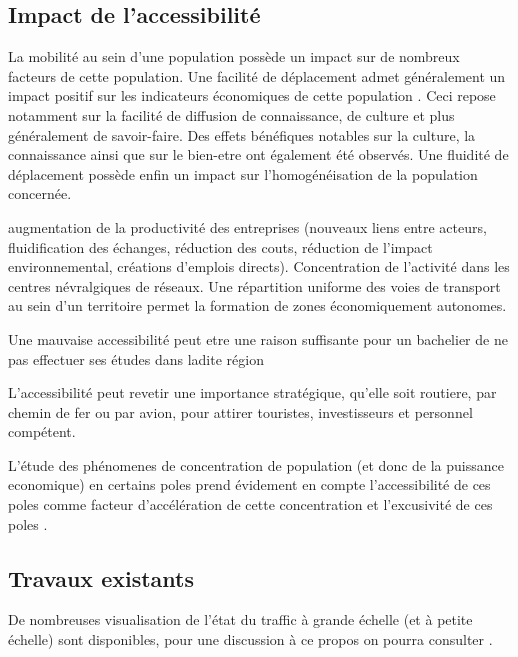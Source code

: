 \documentclass{vgtc}                          %
\begin{document}
\vspace{0.3cm}
\subsection{Impact de l'accessibilité}

\vspace{0.3cm}



La mobilité au sein d'une population possède un impact sur de nombreux facteurs de cette population. Une facilité de déplacement admet généralement un impact positif sur les indicateurs économiques de cette population \cite{}. Ceci repose notamment sur la facilité de diffusion de connaissance, de culture et plus généralement de savoir-faire. Des effets bénéfiques notables sur la culture, la connaissance ainsi que sur le bien-etre ont également été observés. Une fluidité de déplacement possède enfin un impact sur l'homogénéisation de la population concernée.

augmentation de la productivité des entreprises (nouveaux liens entre acteurs, fluidification des échanges, réduction des couts, réduction de l'impact environnemental, créations d'emplois directs). Concentration de l'activité dans les centres névralgiques de réseaux. Une répartition uniforme des voies de transport au sein d'un territoire permet la formation de zones économiquement autonomes.

Une mauvaise accessibilité peut etre une raison suffisante pour un bachelier de ne pas effectuer ses études dans ladite région

L'accessibilité peut revetir une importance stratégique, qu'elle soit routiere, par chemin de fer ou par avion, pour attirer touristes, investisseurs et personnel compétent. 

L'étude des phénomenes de concentration de population (et donc de la puissance economique) en certains poles prend évidement en compte l'accessibilité de ces poles comme facteur d'accélération de cette concentration et l'excusivité de ces poles \cite{RePEc:mtp:titles:0262561476}.

\subsection{Travaux existants}

De nombreuses visualisation de l'état du traffic à grande échelle (et à petite échelle) sont disponibles, pour une discussion à ce propos on pourra consulter \cite{schoedon2016interactive}. 
\end{document}
